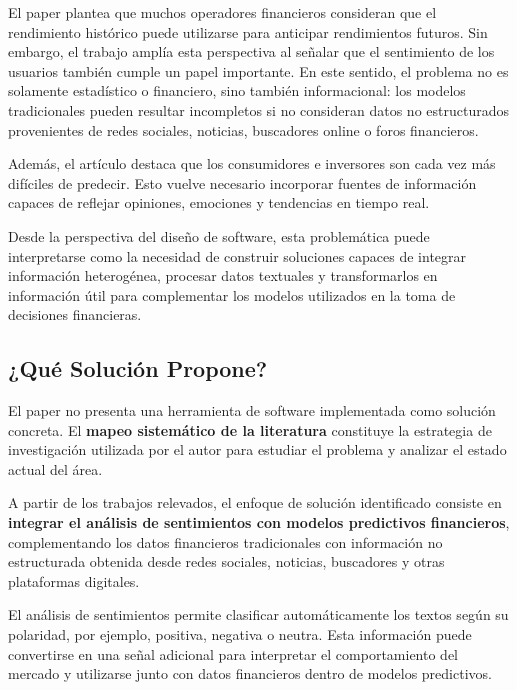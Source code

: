 El paper plantea que muchos operadores financieros consideran que el rendimiento histórico puede utilizarse para anticipar rendimientos futuros. Sin embargo, el trabajo amplía esta perspectiva al señalar que el sentimiento de los usuarios también cumple un papel importante. En este sentido, el problema no es solamente estadístico o financiero, sino también informacional: los modelos tradicionales pueden resultar incompletos si no consideran datos no estructurados provenientes de redes sociales, noticias, buscadores online o foros financieros.

\vspace{2mm}

Además, el artículo destaca que los consumidores e inversores son cada vez más difíciles de predecir. Esto vuelve necesario incorporar fuentes de información capaces de reflejar opiniones, emociones y tendencias en tiempo real.

\vspace{2mm}

Desde la perspectiva del diseño de software, esta problemática puede interpretarse como la necesidad de construir soluciones capaces de integrar información heterogénea, procesar datos textuales y transformarlos en información útil para complementar los modelos utilizados en la toma de decisiones financieras.


\subsection{¿Qué Solución Propone?}
\vspace{2mm}

El paper no presenta una herramienta de software implementada como solución concreta. El \textbf{mapeo sistemático de la literatura} constituye la estrategia de investigación utilizada por el autor para estudiar el problema y analizar el estado actual del área.

\vspace{2mm}

A partir de los trabajos relevados, el enfoque de solución identificado consiste en \textbf{integrar el análisis de sentimientos con modelos predictivos financieros}, complementando los datos financieros tradicionales con información no estructurada obtenida desde redes sociales, noticias, buscadores y otras plataformas digitales.

\vspace{2mm}

El análisis de sentimientos permite clasificar automáticamente los textos según su polaridad, por ejemplo, positiva, negativa o neutra. Esta información puede convertirse en una señal adicional para interpretar el comportamiento del mercado y utilizarse junto con datos financieros dentro de modelos predictivos.

